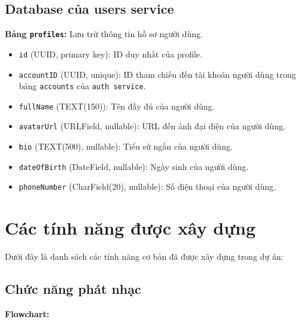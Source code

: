 \subsection{Database của users service}
\label{subsec:db_users_service}

\textbf{Bảng \texttt{profiles}:} Lưu trữ thông tin hồ sơ người dùng.
\begin{itemize}
    \item \texttt{id} (UUID, primary key): ID duy nhất của profile.
    \item \texttt{accountID} (UUID, unique): ID tham chiếu đến tài khoản người dùng trong bảng \texttt{accounts} của \texttt{auth service}.
    \item \texttt{fullName} (TEXT(150)): Tên đầy đủ của người dùng.
    \item \texttt{avatarUrl} (URLField, nullable): URL đến ảnh đại diện của người dùng.
    \item \texttt{bio} (TEXT(500), nullable): Tiểu sử ngắn của người dùng.
    \item \texttt{dateOfBirth} (DateField, nullable): Ngày sinh của người dùng.
    \item \texttt{phoneNumber} (CharField(20), nullable): Số điện thoại của người dùng.
\end{itemize}
\begin{comment}
\textbf{Bảng \texttt{favorite} (sẽ được thêm):} Bảng trung gian thể hiện mối quan hệ nhiều-nhiều giữa người dùng và bài hát yêu thích.
\begin{itemize}
    \item \texttt{userId} (UUID): ID của người dùng.
    \item \texttt{songId} (UUID): ID của bài hát.
    \item \texttt{timestamp} (DateTimeField): Thời điểm thêm vào danh sách yêu thích.
    \item \textit{(Có thể có thêm các trường khác)}
\end{itemize}
\end{comment}


\section{Các tính năng được xây dựng}
\label{sec:built_features}

Dưới đây là danh sách các tính năng cơ bản đã được xây dựng trong dự án:

\subsection{Chức năng phát nhạc}
\label{subsec:play_music}
\textbf{Flowchart:}

